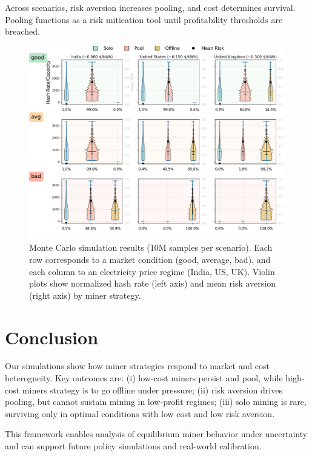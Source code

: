 \documentclass[12pt]{article}
\begin{document}
Across scenarios, risk aversion increases pooling, and cost determines survival. Pooling functions as a risk mitication tool until profitability thresholds are breached.

\begin{figure}[ht]
	\centering
	\includegraphics[width=\linewidth]{img/MC_10M.png}
	\caption{Monte Carlo simulation results (10M samples per scenario). Each row corresponds to a market condition (good, average, bad), and each column to an electricity price regime (India, US, UK). Violin plots show normalized hash rate (left axis) and mean risk aversion (right axis) by miner strategy.}
	\label{fig:violin}
\end{figure}


\section{Conclusion}
Our simulations show how miner strategies respond to market and cost heterogneity. Key outcomes are: (i) low-cost miners persist and pool, while high-cost miners strategy is to go offline under pressure; (ii) risk aversion drives pooling, but cannot sustain mining in low-profit regimes; (iii) solo mining is rare, surviving only in optimal conditions with low cost and low risk aversion.

This framework enables analysis of equilibrium miner behavior under uncertainty and can support future policy simulations and real-world calibration.



\end{document}
